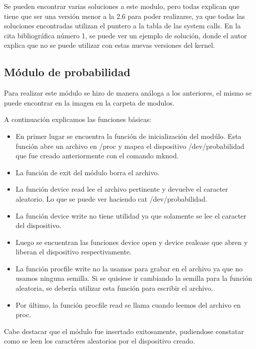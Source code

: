 \documentclass[a4paper, 12pt]{article}
\begin{document}
Se pueden encontrar varias soluciones a este modulo, pero todas explican que tiene que ser una versi\'on menor a la 2.6 para poder realizarse, ya que todas las soluciones encontradas utilizan el puntero a la tabla de las system calls. En la cita bibliogr\'afica n\'umero 1, se puede ver un ejemplo de soluci\'on, donde el autor explica que no se puede utilizar con estas nuevas versiones del kernel.


\subsection*{M\'odulo de probabilidad}


Para realizar este m\'odulo se hizo de manera an\'aloga a los anteriores, el mismo se puede encontrar en la imagen en la carpeta de modulos. 

A continuaci\'on explicamos las funciones b\'asicas:

\begin{itemize}
\item En primer lugar se encuentra la funci\'on de inicializaci\'on del mod\'ulo. Esta funci\'on abre un archivo en /proc y mapea el dispositivo /dev/probabilidad que fue creado anteriormente con el comando mknod.
\item La funci\'on de exit del m\'odulo borra el archivo.
\item La funci\'on device read lee el archivo pertinente y devuelve el caracter aleatorio. Lo que se puede ver haciendo cat /dev/probabilidad.
\item La funci\'on device write no tiene utilidad ya que solamente se lee el caracter del dispositivo.
\item Luego se encuentran las funciones device open y device realease que abren y liberan el dispositivo respectivamente.
\item La funci\'on procfile write no la usamos para grabar en el archivo ya que no usamos ninguna semilla. Si se quisiese ir cambiando la semilla para la funci\'on aleatoria, se deber\'ia utilizar esta funci\'on para escribir el archivo.
\item Por \'ultimo, la funci\'on procfile read se llama cuando leemos del archivo en proc. 
\end{itemize}

Cabe destacar que el m\'odulo fue insertado exitosamente, pudiendose constatar como se leen los caract\'eres aleatorios por el dispositivo creado.
\end{document}
